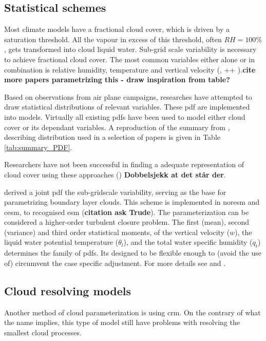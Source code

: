\subsection{Statistical schemes}
Most climate models have a fractional cloud cover, which is driven by a saturation threshold. All the vapour in excess of this threshold, often $RH=100\%$, gets transformed into cloud liquid water. Sub-grid scale variability is necessary to achieve fractional cloud cover. The most common variables either alone or in combination is relative humidity, temperature and vertical velocity (\cite{Golaz2002_part1}, ++ ).\textbf{cite more papers parametrizing this - draw inspiration from table?}  

Based on observations from air plane campaigns, researches have attempted to draw statistical distributions of relevant variables. These \acrfull{pdf} are implemented into models. Virtually all existing \acrshort{pdf}s have been used to model either cloud cover or its dependant variables. %
A reproduction of the summary from \cite{Tompkins2009CloudParametrization}, describing distribution used in a selection of papers is given in Table \ref{tab:summary_PDF}.

Researchers have not been successful in finding a adequate representation of cloud cover using these approaches (\cite{Tompkins2009CloudParametrization}) \textbf{Dobbelsjekk at det står der}. 

\cite{Golaz2002_part1} derived a joint \acrshort{pdf} the sub-gridscale variability, serving as the base for parametrizing boundary layer clouds. This scheme is implemented in \acrfull{noresm} and \acrfull{cesm}, to recognised \acrshort{esm} (\textbf{citation ask Trude}). The parameterization can be considered a higher-order turbulent closure problem. The first (mean), second (variance) and third order statistical moments, of the vertical velocity ($w$), the liquid water potential temperature ($\theta_l$), and the total water specific humidity ($q_t$) determines the family of \acrshort{pdf}s. Its designed to be flexible enough to (avoid the use of) circumvent the case specific adjustment. For more details see \cite{Golaz2002_part1} and \cite{Golaz2002_part2}.

\subsection{Cloud resolving models} \label{sec:params_climate_models}
Another method of cloud parameterization is using \acrfull{crm}. On the contrary of what the name implies, this type of model still have problems with resolving the smallest cloud processes. 

